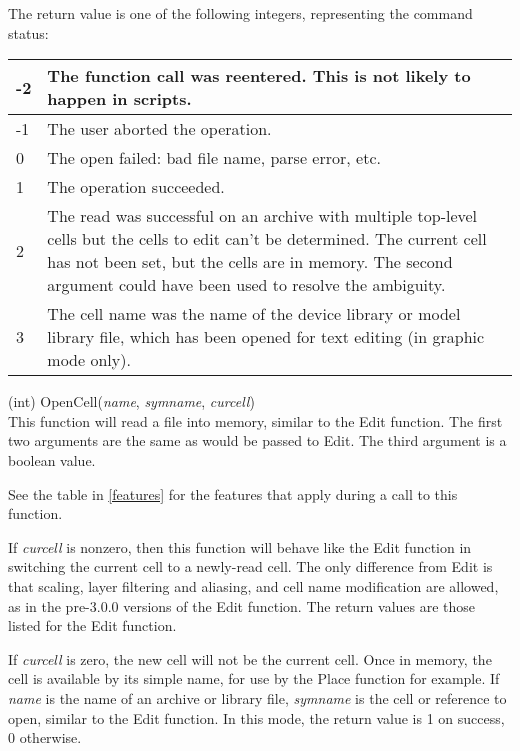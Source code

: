 \begin{description}
The return value is one of the following integers, representing the
command status:

\begin{tabular}{|l|p{4.0in}|}\hline
-2 & The function call was reentered.  This is not likely to happen in
  scripts.\\ \hline
-1 & The user aborted the operation.\\ \hline
0 & The open failed: bad file name, parse error, etc.\\ \hline
1 & The operation succeeded.\\ \hline
2 & The read was successful on an archive with multiple top-level cells
  but the cells to edit can't be determined.  The current cell has not been
  set, but the cells are in memory.  The second argument could have been
  used to resolve the ambiguity.\\ \hline
3 & The cell name was the name of the device library or model library
  file, which has been opened for text editing (in graphic mode only).\\ \hline
\end{tabular}

\item{(int) \vt OpenCell({\it name\/}, {\it symname\/}, {\it curcell\/})}\\
This function will read a file into memory, similar to the {\vt Edit}
function.  The first two arguments are the same as would be passed to
{\vt Edit}.  The third argument is a boolean value.

See the table in \ref{features} for the features that apply during a
call to this function.

If {\it curcell} is nonzero, then this function will behave like the
{\vt Edit} function in switching the current cell to a newly-read
cell.  The only difference from {\vt Edit} is that scaling, layer
filtering and aliasing, and cell name modification are allowed, as in
the pre-3.0.0 versions of the {\vt Edit} function.  The return values
are those listed for the {\vt Edit} function.

If {\it curcell} is zero, the new cell will not be the current cell. 
Once in memory, the cell is available by its simple name, for use by
the {\vt Place} function for example.  If {\it name} is the name of an
archive or library file, {\it symname} is the cell or reference to
open, similar to the {\vt Edit} function.  In this mode, the return
value is 1 on success, 0 otherwise.


\end{description}
